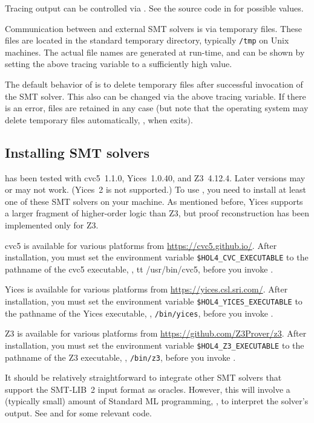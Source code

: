 Tracing output can be controlled via .  See the source code in  for
possible values.

Communication between \HOL{} and external SMT solvers is via temporary
files.  These files are located in the standard temporary directory,
typically {\tt /tmp} on Unix machines.  The actual file names are
generated at run-time, and can be shown by setting the above tracing
variable to a sufficiently high value.

The default behavior of  is to delete temporary files
after successful invocation of the SMT solver.  This also can be
changed via the above tracing variable.  If there is an error, files
are retained in any case (but note that the operating system may
delete temporary files automatically, \eg, when \HOL{} exits).

\subsection{Installing SMT solvers}

 has been tested with cvc5~1.1.0, Yices~1.0.40, and
Z3~4.12.4. Later versions may or may not work.  (Yices~2 is not
supported.)  To use , you need to install at least one
of these SMT solvers on your machine.  As mentioned before, Yices
supports a larger fragment of higher-order logic than Z3, but proof
reconstruction has been implemented only for Z3.

cvc5 is available for various platforms from
\url{https://cvc5.github.io/}. After installation, you must set the
environment variable {\tt \$HOL4\_CVC\_EXECUTABLE} to the pathname of
the cvc5 executable, \eg, {tt /usr/bin/cvc5}, before you invoke \HOL.

Yices is available for various platforms from
\url{https://yices.csl.sri.com/}.  After installation, you must set
the environment variable {\tt \$HOL4\_YICES\_EXECUTABLE} to the
pathname of the Yices executable, \eg, {\tt /bin/yices}, before you
invoke \HOL.

Z3 is available for various platforms from
\url{https://github.com/Z3Prover/z3}. After installation, you must set
the environment variable {\tt \$HOL4\_Z3\_EXECUTABLE} to the pathname
of the Z3 executable, \eg, {\tt /bin/z3}, before you invoke \HOL.

It should be relatively straightforward to integrate other SMT solvers
that support the SMT-LIB~2 input format as oracles.  However, this
will involve a (typically small) amount of Standard ML programming,
\eg, to interpret the solver's output.  See  and
 for some relevant code.

